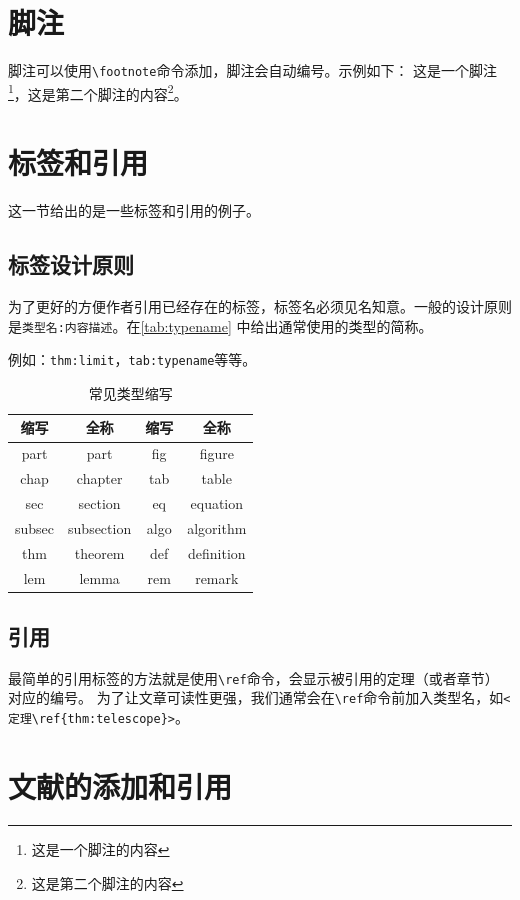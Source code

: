 \section{脚注}
脚注可以使用\verb|\footnote|命令添加，脚注会自动编号。示例如下：
这是一个脚注\footnote{这是一个脚注的内容}，这是第二个脚注的内容\footnote{这是第二个脚注的内容}。
\section{标签和引用}

这一节给出的是一些标签和引用的例子。

\subsection{标签设计原则}

为了更好的方便作者引用已经存在的标签，标签名必须见名知意。一般的设计原则是\verb|类型名:内容描述|。在\autoref{tab:typename} 中给出通常使用的类型的简称。

例如：\verb|thm:limit|，\verb|tab:typename|等等。

\begin{table}[!htp]
	\centering
	\caption{常见类型缩写}
	\begin{tabular}{c|c|c|c}\label{tab:typename}
		缩写 & 全称 & 缩写 & 全称 \\
		\hline
		part & part & fig & figure \\
		chap & chapter & tab & table \\
		sec & section & eq & equation \\
		subsec & subsection & algo & algorithm \\
		thm & theorem & def & definition \\
		lem & lemma & rem & remark \\
	\end{tabular}
\end{table}

\subsection{引用}

最简单的引用标签的方法就是使用\verb|\ref|命令，会显示被引用的定理（或者章节）对应的编号。
为了让文章可读性更强，我们通常会在\verb|\ref|命令前加入类型名，如\verb|<定理\ref{thm:telescope}>|。

\section{文献的添加和引用}


